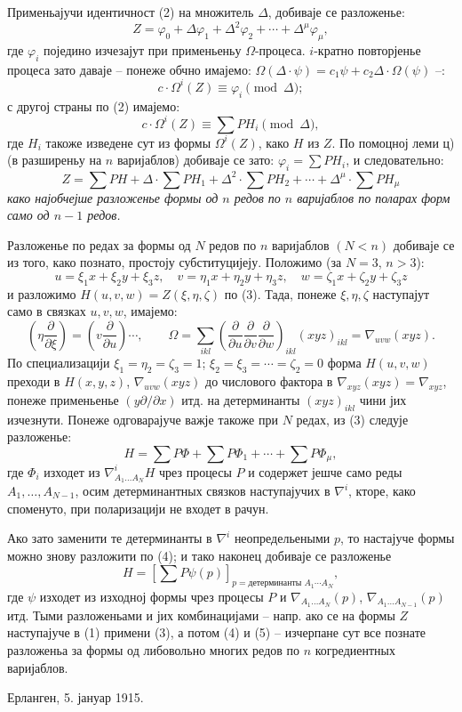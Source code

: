 \documentclass[11pt]{article}
\begin{document}
Применьајучи идентичност (2) на множитель $\Delta$, добиваје се разложенье:
\[
  Z=\varphi_0+\Delta\varphi_1+\Delta^2\varphi_2+\cdots+\Delta^\mu\varphi_\mu,
\]
где $\varphi_i$ поједино изчезајут при применьеньу $\Omega$-процеса. $i$-кратно повторјенье процеса зато даваје -- понеже обчно имајемо: $\Omega(\Delta\cdot\psi)=c_1\psi+c_2\Delta\cdot\Omega(\psi)$ --:
\[
  c\cdot \Omega^i(Z)\equiv\varphi_i\pmod{\Delta};
\]
с другој страны по (2) имајемо:
\[
  c\cdot\Omega^i(Z)\equiv\sum PH_i\pmod{\Delta},
\]
где $H_i$ такоже изведене сут из формы $\Omega^i(Z)$, како $H$ из $Z$. По помоцној леми ц) (в разширеньу на $n$ варијаблов) добиваје се зато: $\varphi_i=\sum PH_i$, и следовательно:
\begin{equation}
  Z=\sum PH+\Delta\cdot\sum PH_1+\Delta^2\cdot\sum PH_2+
  \cdots+\Delta^\mu\cdot\sum PH_\mu
\tag{3}
\end{equation}
{\itshape како најобчејше разложенье формы од $n$ редов по $n$ варијаблов по поларах форм само од $n-1$ редов.}

Разложенье по редах за формы од $N$ редов по $n$ варијаблов $(N<n)$ добиваје се из того, како познато, простоју субституцијеју. Положимо (за $N=3$, $n>3$):
\[
  u=\xi_1x+\xi_2y+\xi_3z,
  \quad v=\eta_1x+\eta_2y+\eta_3z,
  \quad w=\zeta_1x+\zeta_2y+\zeta_3z
\]
и разложимо $H(u,v,w)=Z(\xi,\eta,\zeta)$ по (3). Тада, понеже $\xi,\eta,\zeta$ наступајут само в связках $u,v,w$, имајемо:
\[
  \left(\eta\frac{\partial}{\partial \xi}\right)=
  \left(v\frac{\partial}{\partial u}\right)\cdots,
  \qquad
  \Omega=\sum_{ikl}\left(\frac{\partial}{\partial u}
  \frac{\partial}{\partial v}
  \frac{\partial}{\partial w}\right)_{ikl}(xyz)_{ikl}
  =\nabla_{uvw}(xyz).
\]
По специализацији $\xi_1=\eta_2=\zeta_3=1$; $\xi_2=\xi_3=\cdots=\zeta_2=0$ форма $H(u,v,w)$ преходи в $H(x,y,z)$, $\nabla_{uvw}(xyz)$ до числового фактора в $\nabla_{xyz}(xyz)=\nabla_{xyz}$, понеже применьенье $(y\partial/\partial x)$ итд. на детерминанты $(xyz)_{ikl}$ чини јих изчезнути. Понеже одговарајуче важје такоже при $N$ редах, из (3) следује разложенье:
\begin{equation}
  H=\sum P\Phi+\sum P\Phi_1+\cdots+\sum P\Phi_\mu,
\tag{4}
\end{equation}
где $\Phi_i$ изходет из $\nabla^i_{A_1\ldots A_N}H$ чрез процесы $P$ и содержет јешче само реды $A_1,\ldots,A_{N-1}$, осим детерминантных связков наступајучих в $\nabla^i$, кторе, како споменуто, при поларизацији не входет в рачун.

Ако зато заменити те детерминанты в $\nabla^i$ неопредельеными $p$, то настајуче формы можно знову разложити по (4); и тако наконец добиваје се разложенье
\begin{equation}
  H=\left[\sum P\psi(p)\right]_{p=\text{детерминанты }A_1\cdots A_N},
\tag{5}
\end{equation}
где $\psi$ изходет из изходној формы чрез процесы $P$ и $\nabla_{A_1\ldots A_N}(p)$, $\nabla_{A_1\ldots A_{N-1}}(p)$ итд. Тыми разложеньами и јих комбинацијами -- напр. ако се на формы $Z$ наступајуче в (1) примени (3), а потом (4) и (5) -- изчерпане сут все познате разложеньа за формы од либовольно многих редов по $n$ когредиентных варијаблов.

Ерланген, 5. јануар 1915.
\end{document}
